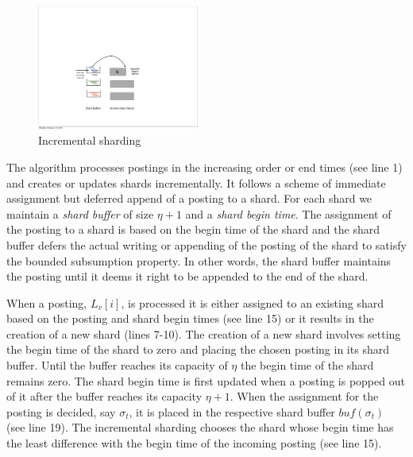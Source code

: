 \begin{figure}[tb]
	\centering
		\includegraphics[width=0.475\textwidth]{resources/inc_sharding.pdf}
	\caption{Incremental sharding}
	 \label{fig:inc_sharding}
\end{figure}

The algorithm processes postings in the increasing order or end times (see line 1) and creates or updates shards incrementally. It follows a scheme of immediate assignment but deferred append of a posting to a shard. For each shard we maintain a \emph{shard buffer} of size $\eta+1$ and a \emph{shard begin time}. The assignment of the posting to a shard is based on the begin time of the shard and the shard buffer defers the actual writing or appending of the posting of the shard to satisfy the bounded subsumption property. In other words, the shard buffer maintains the posting until it deems it right to be appended to the end of the shard.

When a posting, $L_v[i]$, is processed it is either assigned to an existing shard based on the posting and shard begin times (see line 15) or it results in the creation of a new shard (lines 7-10). The creation of a new shard involves setting the begin time of the shard to zero and placing the chosen posting in its shard buffer. Until the buffer reaches its capacity of $\eta$ the begin time of the shard remains zero. The shard begin time is first updated when a posting is popped out of it after the buffer reaches its capacity $\eta+1$.  When the assignment for the posting is decided, say $\sigma_t$, it is placed in the respective shard buffer $bu\!f(\sigma_t)$ (see line 19). The incremental sharding chooses the shard whose begin time has the least difference with the begin time of the incoming posting (see line 15). 

